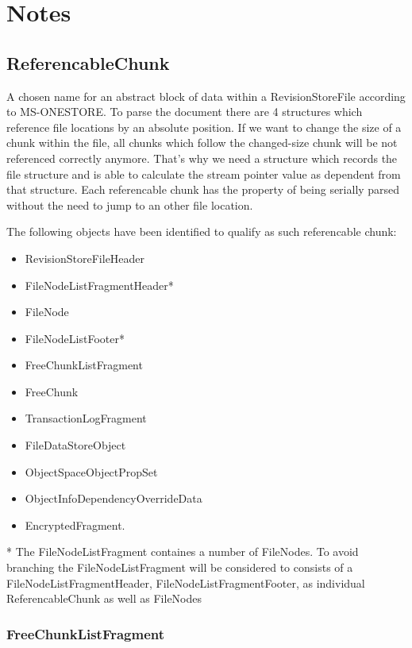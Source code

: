 \documentclass[11pt,a4paper]{book}
\begin{document}
	


	
\chapter{Notes}

\section{ReferencableChunk}
A chosen name for an abstract block of data within a RevisionStoreFile according to MS-ONESTORE.
To parse the document there are 4 structures which reference file locations by an absolute position.
If we want to change the size of a chunk within the file, all chunks which follow the changed-size chunk will be not referenced correctly anymore.
That’s why we need a structure which records the file structure and is able to calculate the stream pointer value as dependent from that structure.
Each referencable chunk has the property of being serially parsed without the need to jump to an other file location.

The following objects have been identified to qualify as such referencable chunk:
\begin{itemize}
\item RevisionStoreFileHeader
\item FileNodeListFragmentHeader*
\item FileNode
\item FileNodeListFooter*
\item FreeChunkListFragment
\item FreeChunk
\item TransactionLogFragment
\item FileDataStoreObject
\item ObjectSpaceObjectPropSet
\item ObjectInfoDependencyOverrideData
\item EncryptedFragment.
\end{itemize}
* The FileNodeListFragment containes a number of FileNodes. To avoid branching the FileNodeListFragment will be considered to consists of a FileNodeListFragmentHeader, FileNodeListFragmentFooter, as individual ReferencableChunk as well as FileNodes

\subsection{FreeChunkListFragment}
\end{document}
